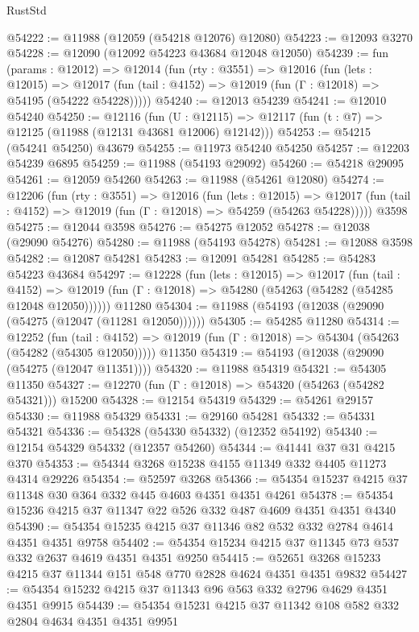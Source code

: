 \begin{lexlean}{RustStd}
\begin{coremodule}
@54222 := @11988 (@12059 (@54218 @12076) @12080)
@54223 := @12093 @3270
@54228 := @12090 (@12092 @54223 @43684 @12048 @12050)
@54239 := fun (params : @12012) =>
  @12014
    (fun (rty : @3551) =>
    @12016
      (fun (lets : @12015) =>
      @12017 (fun (tail : @4152) => @12019 (fun (Γ : @12018) => @54195 (@54222 @54228)))))
@54240 := @12013 @54239
@54241 := @12010 @54240
@54250 := @12116
    (fun (U : @12115) => @12117 (fun (t : @7) => @12125 (@11988 (@12131 @43681 @12006) @12142)))
@54253 := @54215 (@54241 @54250) @43679
@54255 := @11973 @54240 @54250
@54257 := @12203 @54239 @6895
@54259 := @11988 (@54193 @29092)
@54260 := @54218 @29095
@54261 := @12059 @54260
@54263 := @11988 (@54261 @12080)
@54274 := @12206
    (fun (rty : @3551) =>
    @12016
      (fun (lets : @12015) =>
      @12017 (fun (tail : @4152) => @12019 (fun (Γ : @12018) => @54259 (@54263 @54228)))))
    @3598
@54275 := @12044 @3598
@54276 := @54275 @12052
@54278 := @12038 (@29090 @54276)
@54280 := @11988 (@54193 @54278)
@54281 := @12088 @3598
@54282 := @12087 @54281
@54283 := @12091 @54281
@54285 := @54283 @54223 @43684
@54297 := @12228
    (fun (lets : @12015) =>
    @12017
      (fun (tail : @4152) =>
      @12019 (fun (Γ : @12018) => @54280 (@54263 (@54282 (@54285 @12048 @12050))))))
    @11280
@54304 := @11988 (@54193 (@12038 (@29090 (@54275 (@12047 (@11281 @12050))))))
@54305 := @54285 @11280
@54314 := @12252
    (fun (tail : @4152) => @12019 (fun (Γ : @12018) => @54304 (@54263 (@54282 (@54305 @12050)))))
    @11350
@54319 := @54193 (@12038 (@29090 (@54275 (@12047 @11351))))
@54320 := @11988 @54319
@54321 := @54305 @11350
@54327 := @12270 (fun (Γ : @12018) => @54320 (@54263 (@54282 @54321))) @15200
@54328 := @12154 @54319
@54329 := @54261 @29157
@54330 := @11988 @54329
@54331 := @29160 @54281
@54332 := @54331 @54321
@54336 := @54328 (@54330 @54332) (@12352 @54192)
@54340 := @12154 @54329 @54332 (@12357 @54260)
@54344 := @41441 @37 @31 @4215 @370
@54353 := @54344 @3268 @15238 @4155 @11349 @332 @4405 @11273 @4314 @29226
@54354 := @52597 @3268
@54366 := @54354 @15237 @4215 @37 @11348 @30 @364 @332 @445 @4603 @4351 @4351 @4261
@54378 := @54354 @15236 @4215 @37 @11347 @22 @526 @332 @487 @4609 @4351 @4351 @4340
@54390 := @54354 @15235 @4215 @37 @11346 @82 @532 @332 @2784 @4614 @4351 @4351 @9758
@54402 := @54354 @15234 @4215 @37 @11345 @73 @537 @332 @2637 @4619 @4351 @4351 @9250
@54415 := @52651 @3268 @15233 @4215 @37 @11344 @151 @548 @770 @2828 @4624 @4351 @4351 @9832
@54427 := @54354 @15232 @4215 @37 @11343 @96 @563 @332 @2796 @4629 @4351 @4351 @9915
@54439 := @54354 @15231 @4215 @37 @11342 @108 @582 @332 @2804 @4634 @4351 @4351 @9951

\end{coremodule}
\end{lexlean}
